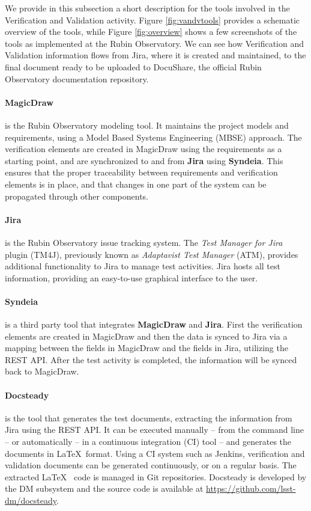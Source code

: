 We provide in this subsection a short description for the tools involved in the Verification and Validation activity.
Figure \ref{fig:vandvtools} provides a schematic overview of the tools, while
Figure \ref{fig:overview}  shows a few screenshots of the tools as implemented at the Rubin Observatory.
We can see how Verification and Validation information flows from Jira, where it is created and maintained,
to the final document ready to be uploaded to DocuShare, the official Rubin Observatory documentation repository. 


\paragraph{MagicDraw}
is the Rubin Observatory modeling tool. It maintains the project models and requirements,
using a Model Based Systems Engineering (MBSE) approach.
The verification elements are created in MagicDraw using the requirements as a starting point,
and are synchronized to and from \textbf{Jira} using \textbf{Syndeia}.
This ensures that the proper traceability between requirements and verification elements is in place,
and that changes in one part of the system can be propagated through other components.

\paragraph{Jira}
is the Rubin Observatory issue tracking system.
The \textit{Test Manager for Jira} plugin (TM4J), previously known as \textit{Adaptavist Test Manager} (ATM),
provides additional functionality to Jira to manage test activities.
Jira hosts all test information, providing an easy-to-use graphical interface to the user.

\paragraph{Syndeia}
is a third party tool that integrates \textbf{MagicDraw} and \textbf{Jira}. 
First the verification elements are created in MagicDraw and then the data is synced to Jira
via a mapping between the fields in MagicDraw and the fields in Jira, utilizing the REST API.
After the test activity is completed, the information will be synced back to MagicDraw.

\paragraph{Docsteady}
is the tool that generates the test documents, extracting the information from Jira using the REST API.
It can be executed manually -- from the command line -- or automatically -- in a continuous integration (CI) tool --
and generates the documents in \LaTeX~format.
Using a CI system such as Jenkins, verification and validation documents can be generated continuously, or on a regular basis.
The extracted \LaTeX~ code is managed in Git repositories.
Docsteady is developed by the DM subsystem and the source code is available at \url{https://github.com/lsst-dm/docsteady}.

